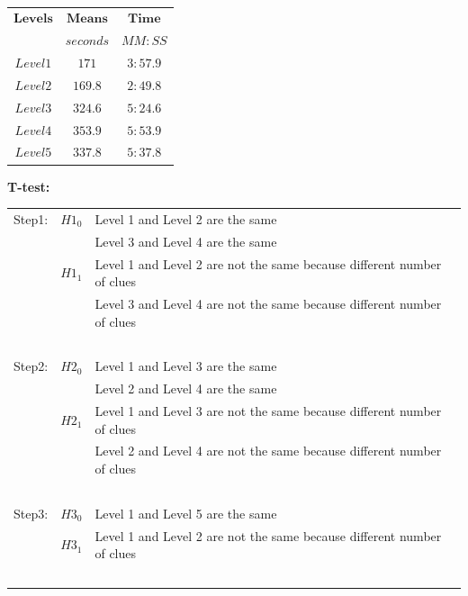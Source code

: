 ~
\begin{minipage}[b]{0.35\linewidth}
    \begin{tabular}[t]{|c|c|c|}
    \hline
    $\textbf{Levels}$&$ \textbf{Means}$&$\textbf{Time}$\\
                     &$ seconds $            &$MM:SS$\\
    \hline
    $Level 1$ & $171$ & $3:57.9$\\
    $Level 2$ & $169.8$ & $2:49.8$\\
    $Level 3$ & $324.6$ & $5:24.6$\\
    $Level 4$ & $353.9$ & $5:53.9$\\
    $Level 5$ & $337.8$ & $5:37.8$\\
    \hline
    \end{tabular} 
    \label{table:success_time}
\end{minipage} 
\clearpage




\textbf{T-test:}\\
\begin{tabular}{ c c l }
 Step1: & $H1_{0}$  & Level 1 and Level 2 are the same \\ 
        &           & Level 3 and Level 4 are the same \\  
        & $H1_{1}$  & Level 1 and Level 2 are not the same because different number of clues\\
        &           & Level 3 and Level 4 are not the same because different number of clues\\~\\
 Step2: & $H2_{0}$  & Level 1 and Level 3 are the same \\ 
        &           & Level 2 and Level 4 are the same \\  
        & $H2_{1}$  & Level 1 and Level 3 are not the same because different number of clues\\
        &           & Level 2 and Level 4 are not the same because different number of clues\\~\\

 Step3: & $H3_{0}$  & Level 1 and Level 5 are the same \\
        & $H3_{1}$  & Level 1 and Level 2 are not the same because different number of clues\\~\\
\end{tabular}



